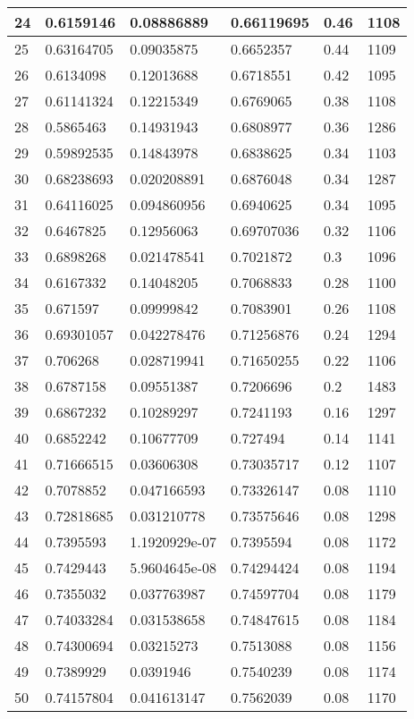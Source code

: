\begin{longtable}{|l|l|l|l|l|l|}
24 & 0.6159146 & 0.08886889 & 0.66119695 & 0.46 & 1108 \\ \hline 
25 & 0.63164705 & 0.09035875 & 0.6652357 & 0.44 & 1109 \\ \hline 
26 & 0.6134098 & 0.12013688 & 0.6718551 & 0.42 & 1095 \\ \hline 
27 & 0.61141324 & 0.12215349 & 0.6769065 & 0.38 & 1108 \\ \hline 
28 & 0.5865463 & 0.14931943 & 0.6808977 & 0.36 & 1286 \\ \hline 
29 & 0.59892535 & 0.14843978 & 0.6838625 & 0.34 & 1103 \\ \hline 
30 & 0.68238693 & 0.020208891 & 0.6876048 & 0.34 & 1287 \\ \hline 
31 & 0.64116025 & 0.094860956 & 0.6940625 & 0.34 & 1095 \\ \hline 
32 & 0.6467825 & 0.12956063 & 0.69707036 & 0.32 & 1106 \\ \hline 
33 & 0.6898268 & 0.021478541 & 0.7021872 & 0.3 & 1096 \\ \hline 
34 & 0.6167332 & 0.14048205 & 0.7068833 & 0.28 & 1100 \\ \hline 
35 & 0.671597 & 0.09999842 & 0.7083901 & 0.26 & 1108 \\ \hline 
36 & 0.69301057 & 0.042278476 & 0.71256876 & 0.24 & 1294 \\ \hline 
37 & 0.706268 & 0.028719941 & 0.71650255 & 0.22 & 1106 \\ \hline 
38 & 0.6787158 & 0.09551387 & 0.7206696 & 0.2 & 1483 \\ \hline 
39 & 0.6867232 & 0.10289297 & 0.7241193 & 0.16 & 1297 \\ \hline 
40 & 0.6852242 & 0.10677709 & 0.727494 & 0.14 & 1141 \\ \hline 
41 & 0.71666515 & 0.03606308 & 0.73035717 & 0.12 & 1107 \\ \hline 
42 & 0.7078852 & 0.047166593 & 0.73326147 & 0.08 & 1110 \\ \hline 
43 & 0.72818685 & 0.031210778 & 0.73575646 & 0.08 & 1298 \\ \hline 
44 & 0.7395593 & 1.1920929e-07 & 0.7395594 & 0.08 & 1172 \\ \hline 
45 & 0.7429443 & 5.9604645e-08 & 0.74294424 & 0.08 & 1194 \\ \hline 
46 & 0.7355032 & 0.037763987 & 0.74597704 & 0.08 & 1179 \\ \hline 
47 & 0.74033284 & 0.031538658 & 0.74847615 & 0.08 & 1184 \\ \hline 
48 & 0.74300694 & 0.03215273 & 0.7513088 & 0.08 & 1156 \\ \hline 
49 & 0.7389929 & 0.0391946 & 0.7540239 & 0.08 & 1174 \\ \hline 
50 & 0.74157804 & 0.041613147 & 0.7562039 & 0.08 & 1170 \\ \hline 
\end{longtable}